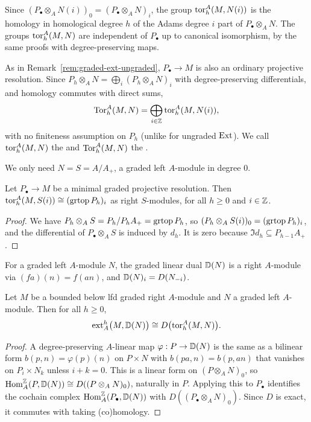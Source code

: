 \begin{advanced}[suppressfirstparskip=true,innertopmargin=0pt]
Since $(P_\bullet\otimes_AN(i))_0=(P_\bullet\otimes_AN)_i$, the group $\operatorname{tor}\nolimits_h^A(M,N(i))$ is the homology in homological degree $h$ of the Adams degree $i$ part of $P_\bullet\otimes_AN$.
The groups $\operatorname{tor}\nolimits_h^A(M,N)$ are independent of $P_\bullet$ up to canonical isomorphism, by the same proofs with degree-preserving maps.

\begin{remark}\label{rem:graded-tor-ungraded}
As in Remark~\ref{rem:graded-ext-ungraded}, $P_\bullet\to M$ is also an ordinary projective resolution.
Since $P_h\otimes_AN=\bigoplus_i(P_h\otimes_AN)_i$ with degree-preserving differentials, and homology commutes with direct sums,
\[
\operatorname{Tor}\nolimits_h^A(M,N)=\bigoplus_{i\in\mathbb{Z}}\operatorname{tor}\nolimits_h^A(M,N(i)),
\]
with no finiteness assumption on $P_h$ (unlike for ungraded $\operatorname{Ext}\nolimits$).
We call $\operatorname{tor}\nolimits_h^A(M,N)$ the  and $\operatorname{Tor}\nolimits_h^A(M,N)$ the .
\end{remark}

We only need $N=S=A/A_+$, a graded left $A$-module in degree $0$.

\begin{proposition}\label{prop:tor-top}
Let $P_\bullet\to M$ be a minimal graded projective resolution.
Then $\operatorname{tor}\nolimits_h^A(M,S(i))\cong(\operatorname{grtop}\nolimits P_h)_i$ as right $S$-modules, for all $h\geq0$ and $i\in\mathbb{Z}$.
\end{proposition}

\begin{proof}
We have $P_h\otimes_AS=P_h/P_hA_+=\operatorname{grtop}\nolimits P_h$, so $(P_h\otimes_AS(i))_0=(\operatorname{grtop}\nolimits P_h)_i$, and the differential of $P_\bullet\otimes_AS$ is induced by $d_h$.
It is zero because $\Im d_h\subseteq P_{h-1}A_+$.
\end{proof}

For a graded left $A$-module $N$, the graded linear dual $\mathbb{D}(N)$ is a right $A$-module via $(fa)(n)=f(an)$, and $\mathbb{D}(N)_i=D(N_{-i})$.

\begin{proposition}\label{prop:ext-tor-duality}
Let $M$ be a bounded below lfd graded right $A$-module and $N$ a graded left $A$-module.
Then for all $h\geq0$,
\[
\operatorname{ext}\nolimits_A^h\bigl(M,\mathbb{D}(N)\bigr)\cong D\bigl(\operatorname{tor}\nolimits_h^A(M,N)\bigr).
\]
\end{proposition}

\begin{proof}
A degree-preserving $A$-linear map $\varphi:P\to\mathbb{D}(N)$ is the same as a bilinear form $b(p,n)=\varphi(p)(n)$ on $P\times N$ with $b(pa,n)=b(p,an)$ that vanishes on $P_i\times N_k$ unless $i+k=0$.
This is a linear form on $(P\otimes_AN)_0$, so $\operatorname{Hom}\nolimits_A^{\mathbb{Z}}(P,\mathbb{D}(N))\cong D((P\otimes_AN)_0)$, naturally in $P$.
Applying this to $P_\bullet$ identifies the cochain complex $\operatorname{Hom}\nolimits_A^{\mathbb{Z}}(P_\bullet,\mathbb{D}(N))$ with $D((P_\bullet\otimes_AN)_0)$.
Since $D$ is exact, it commutes with taking (co)homology.
\end{proof}


\end{advanced}
